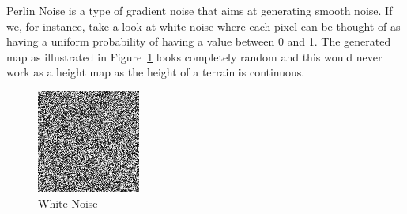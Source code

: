 Perlin Noise is a type of gradient noise that aims at generating smooth noise. If we, for instance, take a look at white noise where each pixel can be thought of as having a uniform probability of having a value between 0 and 1. The generated map as illustrated in Figure~\ref{fig:white_noise} looks completely random and this would never work as a height map as the height of a terrain is continuous.

\begin{figure}[H]
    \centering
    \begin{minipage}[t]{0.45\textwidth}
        \centering
        \includegraphics[width=\textwidth]{images/white_noise.png}
        \caption{White Noise}
        \label{fig:white_noise}
    \end{minipage}
    \hfill
    \begin{minipage}[t]{0.45\textwidth}
        \centering

\end{minipage}
\end{figure}
